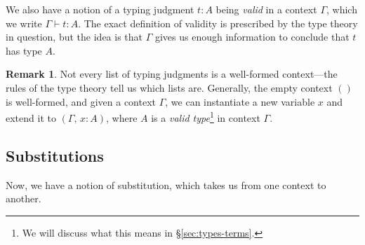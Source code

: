 \documentclass{article}
\theoremstyle{definition}
\newtheorem{remark}[definition]{Remark}
\newcommand{\proves}{\vdash}
\newcommand{\emp}{()}%
\begin{document}
We also have a notion of a typing judgment $t : A$ being \textit{valid} in a context $\Gamma$, which we write $\Gamma \proves t : A$. The exact definition of validity is prescribed by the type theory in question, but the idea is that $\Gamma$ gives us enough information to conclude that $t$ has type $A$.

\begin{remark}
    Not every list of typing judgments is a well-formed context---the rules of the type theory tell us which lists are. Generally, the empty context $\emp$ is well-formed, and given a context $\Gamma$, we can instantiate a new variable $x$ and extend it to $( \Gamma,\, x : A )$, where $A$ is a \textit{valid type}\footnote{We will discuss what this means in \S\ref{sec:types-terms}.} in context $\Gamma$.
\end{remark}


\subsection{Substitutions}

Now, we have a notion of substitution, which takes us from one context to another.

\end{document}
